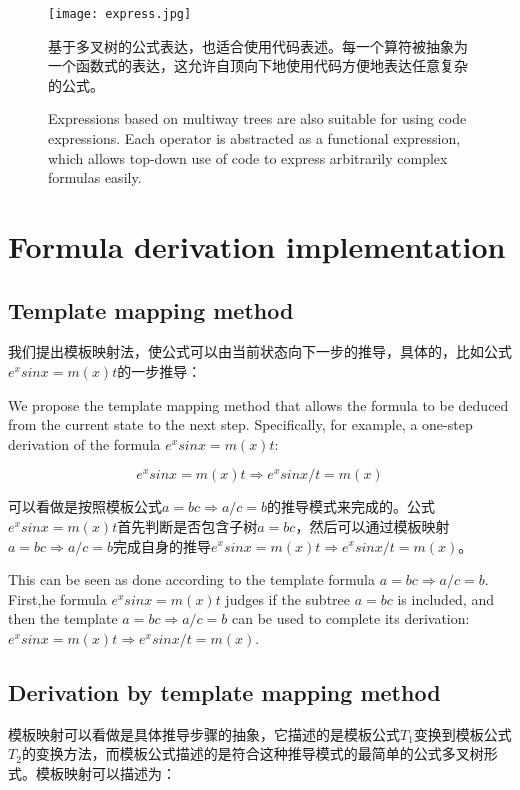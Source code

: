 \documentclass[runningheads]{llncs}
\begin{document}
\begin{figure}[H]
\centering
\texttt{[image: express.jpg]}
\caption{基于多叉树的公式表达，也适合使用代码表述。每一个算符被抽象为一个函数式的表达，这允许自顶向下地使用代码方便地表达任意复杂的公式。}
\caption{Expressions based on multiway trees are also suitable for using code expressions. Each operator is abstracted as a functional expression, which allows top-down use of code to express arbitrarily complex formulas easily.}
\end{figure}









\section{Formula derivation implementation}
\subsection{Template mapping method}
我们提出模板映射法，使公式可以由当前状态向下一步的推导，具体的，比如公式$e^xsinx=m(x)t$的一步推导：

We propose the template mapping method that allows the formula to be deduced from the current state to the next step. Specifically, for example, a one-step derivation of the formula $e^xsinx=m(x)t$:

$$e^xsinx=m(x)t \Rightarrow e^xsinx/t=m(x)$$

可以看做是按照模板公式$a=bc \Rightarrow a/c=b$的推导模式来完成的。公式$e^xsinx=m(x)t$首先判断是否包含子树$a=bc$，然后可以通过模板映射$a=bc \Rightarrow a/c=b$完成自身的推导$e^xsinx=m(x)t \Rightarrow e^xsinx/t=m(x)$。

This can be seen as done according to the template formula $a=bc \Rightarrow a/c=b$. First,he formula $e^xsinx=m(x)t$ judges if the subtree $a=bc$ is included, and then the template $a=bc\Rightarrow a/c=b$ can be used to complete its derivation: $e^xsinx= m(x)t \Rightarrow e^xsinx/t=m(x)$.

\subsection{Derivation by template mapping method}
模板映射可以看做是具体推导步骤的抽象，它描述的是模板公式$T_1$变换到模板公式$T_2$的变换方法，而模板公式描述的是符合这种推导模式的最简单的公式多叉树形式。模板映射可以描述为：
\end{document}
